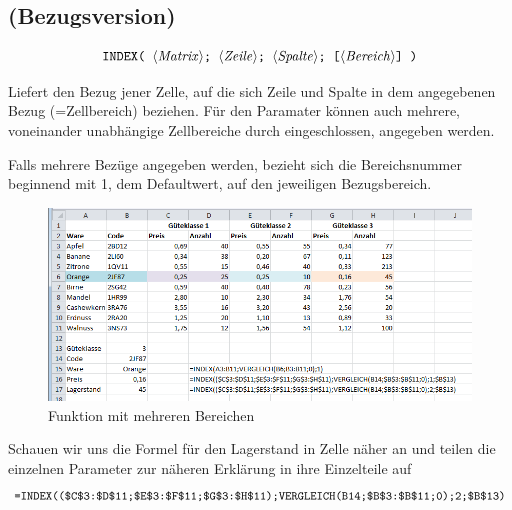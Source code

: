 \subsection{ (Bezugsversion)}

$$ \text{\stmt{INDEX( \syntax{Matrix}; \syntax{Zeile}; \syntax{Spalte}; [\syntax{Bereich}] )}}$$


Liefert den Bezug jener Zelle, auf die sich Zeile und Spalte in dem angegebenen Bezug (=Zellbereich) beziehen. Für den Paramater  können auch mehrere, voneinander unabhängige Zellbereiche durch \stmt{()} eingeschlossen, angegeben werden.

\begin{description}[labelindent=0cm, leftmargin=3cm, font=\mdseries, labelwidth=3cm,style=nextline]
\item[Bereich]Falls mehrere Bezüge angegeben werden, bezieht sich die Bereichsnummer beginnend mit 1, dem Defaultwert, auf den jeweiligen Bezugsbereich.
\end{description}
%
	\begin{figure}[H]
		\centering
			\includegraphics[scale=0.7]{images/index_mit_bezug_b}
		\caption{ Funktion mit mehreren Bereichen}
		\label{fig:matrix_mit_bezug}
	\end{figure}
%
Schauen wir uns die Formel für den Lagerstand in Zelle  näher an und teilen die einzelnen Parameter zur näheren Erklärung in ihre Einzelteile auf%
$$ \text{ \texttt{=INDEX((\$C\$3:\$D\$11;\$E\$3:\$F\$11;\$G\$3:\$H\$11);VERGLEICH(B14;\$B\$3:\$B\$11;0);2;\$B\$13)} }$$

